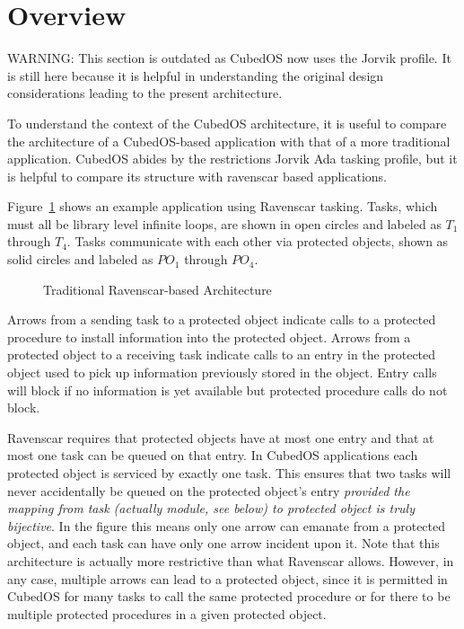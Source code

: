 
\section{Overview}
\label{sec:overview}

WARNING: This section is outdated as CubedOS now uses the Jorvik profile. It is still here because it is helpful in understanding the original design considerations leading to the present architecture.

To understand the context of the CubedOS architecture, it is useful to compare the architecture
of a CubedOS-based application with that of a more traditional application. CubedOS abides
by the restrictions Jorvik Ada tasking profile, but it is helpful to compare its structure with ravenscar based applications.

Figure~\ref{fig:traditional-architecture} shows an example application using Ravenscar tasking.
Tasks, which must all be library level infinite loops, are shown in open circles and labeled as
$T_1$ through $T_4$. Tasks communicate with each other via protected objects, shown as solid
circles and labeled as $PO_1$ through $PO_4$.

\begin{figure}[tbhp]
  \center
  \caption{Traditional Ravenscar-based Architecture}
  \label{fig:traditional-architecture}
\end{figure}

Arrows from a sending task to a protected object indicate calls to a protected procedure to
install information into the protected object. Arrows from a protected object to a receiving
task indicate calls to an entry in the protected object used to pick up information previously
stored in the object. Entry calls will block if no information is yet available but protected
procedure calls do not block.

Ravenscar requires that protected objects have at most one entry and that at most one task can
be queued on that entry. In CubedOS applications each protected object is serviced by exactly
one task. This ensures that two tasks will never accidentally be queued on the protected
object's entry \emph{provided the mapping from task (actually module, see below) to protected
  object is truly bijective}. In the figure this means only one arrow can emanate from a
protected object, and each task can have only one arrow incident upon it. Note that this
architecture is actually more restrictive than what Ravenscar allows. However, in any case,
multiple arrows can lead to a protected object, since it is permitted in CubedOS for many tasks
to call the same protected procedure or for there to be multiple protected procedures in a given
protected object.

